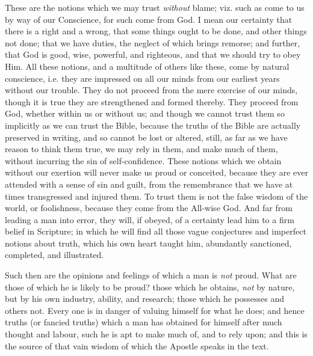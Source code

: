 These are the notions which we may trust \emph{without}
blame; viz. such as come to us by way of our Conscience,
for such come from God. I mean our certainty that there
is a right and a wrong, that some things ought to be
done, and other things not done; that we have duties, the
neglect of which brings remorse; and further, that God is
good, wise, powerful, and righteous, and that we should
try to obey Him. All these notions, and a multitude of
others like these, come by natural conscience, i.e. they
are impressed on all our minds from our earliest years
without our trouble. They do not proceed from the mere
exercise of our minds, though it is true they are
strengthened and formed thereby. They proceed from God,
whether within us or without us; and though we cannot
trust them so implicitly as we can trust the Bible,
because the truths of the Bible are actually preserved in
writing, and so cannot be lost or altered, still, as far
as we have reason to think them true, we may rely in
them, and make much of them, without incurring the sin of
self-confidence. These notions which we obtain without
our exertion will never make us proud or conceited,
because they are ever attended with a sense of sin and
guilt, from the remembrance that we have at times
transgressed and injured them. To trust them is not the
false wisdom of the world, or foolishness, because they
come from the All-wise God. And far from leading a man
into error, they will, if obeyed, of a certainty lead him
to a firm belief in Scripture; in which he will find all
those vague conjectures and imperfect notions about
truth, which his own heart taught him, abundantly
sanctioned, completed, and illustrated.

Such then are the opinions and feelings of which a man
is \emph{not} proud. What are those of which he is
likely to be proud? those which he obtains, \emph{not}
by nature, but by his own industry, ability, and
research; those which he possesses and others not. Every
one is in danger of valuing himself for what he does; and
hence truths (or fancied truths) which a man has obtained
for himself after much thought and labour, such he is apt
to make much of, and to rely upon; and this is the source
of that vain wisdom of which the Apostle speaks in the
text.

